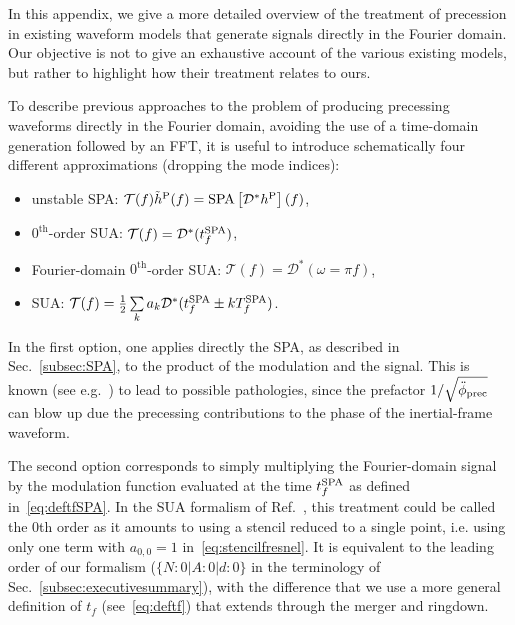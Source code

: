 \documentclass[aps,showpacs,twocolumn,
prd,superscriptaddress,nofootinbib]{revtex4-1}
\newcommand\calT{{\mathcal{T}}}
\newcommand\calD{{\mathcal{D}}}
\newcommand{\Tf}{T_{f}}
\newcommand{\tfSPA}{t_{f}^{\rm SPA}}
\begin{document}
In this appendix, we give a more detailed overview of the treatment of precession in existing waveform models that generate signals directly in the Fourier domain. Our objective is not to give an exhaustive account of the various existing models, but rather to highlight how their treatment relates to ours.

To describe previous approaches to the problem of producing precessing waveforms directly in the Fourier domain, avoiding the use of a time-domain generation followed by an FFT, it is useful to introduce schematically four different approximations (dropping the mode indices):
\begin{itemize}
	\item unstable SPA: $\calT(f) \tilde{h}^{\rm P}(f) = \mathrm{SPA}\left[ \calD^{*} h^{\rm P} \right](f)$,
	\item $0^{\text{th}}$-order SUA: $\calT(f) = \calD^{*}(\tfSPA) $,
	\item Fourier-domain $0^{\text{th}}$-order SUA: $\calT(f) = \calD^{*}(\omega = \pi f ) $,
	\item SUA: $\calT(f) = \frac{1}{2} \sum\limits_{k} a_{k} \calD^{*}(\tfSPA \pm k \Tf^{\rm SPA})$.
\end{itemize}

In the first option, one applies directly the SPA, as described in Sec.~\ref{subsec:SPA}, to the product of the modulation and the signal. This is known (see e.g.~\cite{KCY13}) to lead to possible pathologies, since the prefactor $1/\sqrt{\ddot{\phi}_{\rm prec}}$ can blow up due the precessing contributions to the phase of the inertial-frame waveform.

The second option corresponds to simply multiplying the Fourier-domain signal by the modulation function evaluated at the time $\tfSPA$ as defined in~\eqref{eq:deftfSPA}. In the SUA formalism of Ref.~\cite{KCY14}, this treatment could be called the 0th order as it amounts to using a stencil reduced to a single point, i.e. using only one term with $a_{0,0} = 1$ in~\eqref{eq:stencilfresnel}. It is equivalent to the leading order of our formalism ($\{N:0 | A:0 | d:0 \}$ in the terminology of Sec.~\ref{subsec:executivesummary}), with the difference that we use a more general definition of $t_{f}$ (see~\eqref{eq:deftf}) that extends through the merger and ringdown.
\end{document}
